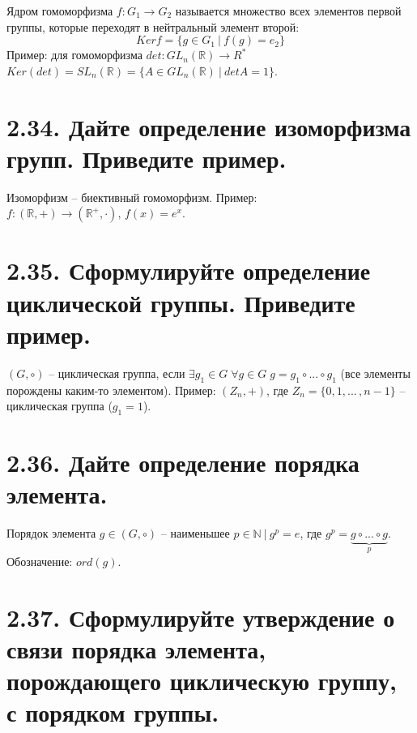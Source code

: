 \documentclass{article}
\begin{document}
Ядром гомоморфизма $f : G_1 \rightarrow G_2$ называется множество всех элементов первой группы, которые переходят в нейтральный элемент второй: $$Kerf = \{g \in G_1 \:|\: f(g) = e_2\}$$
Пример: для гомоморфизма $det : GL_n(\mathbb{R}) \rightarrow R^*$ 
\newline $Ker(det) = SL_n(\mathbb{R}) = \{A \in GL_n(\mathbb{R}) \:|\: detA = 1\}$.

\section*{\LARGE 2.34. Дайте определение изоморфизма групп. Приведите пример. }

Изоморфизм -- биективный гомоморфизм. 
\newline Пример: $f : (\mathbb{R}, +) \rightarrow (\mathbb{R}^+, \cdot), \, f(x) = e^x$.

\section*{\LARGE 2.35. Сформулируйте определение циклической группы. Приведите пример.  }

$(G, \circ)$ -- циклическая группа, если $\exists g_1 \in G \; \forall g \in G \; g = g_1 \circ ... \circ g_1$ (все элементы порождены каким-то элементом). Пример: $(Z_n, +)$, где $Z_n = \{0, 1, ... \,, n - 1\}$ -- циклическая группа ($g_1 = 1$).

\section*{\LARGE 2.36. Дайте определение порядка элемента.  }

Порядок элемента $g \in (G, \circ)$ -- наименьшее $p \in \mathbb{N} \:|\: g^p = e$, где $g^p = \underbrace{g \circ ... \circ g}_{p}$. Обозначение: $ord(g)$.

\section*{\LARGE 2.37. Сформулируйте утверждение о связи порядка элемента, порождающего циклическую группу, с порядком группы.  }
\end{document}
